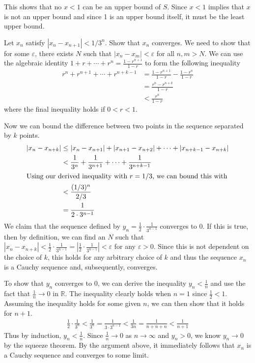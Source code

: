 \documentclass[10pt]{amsart}
\theoremstyle{plain}
\newenvironment{exercise}[1]{%
  \renewcommand\themanualtheoreminner{#1}%
  \manualtheoreminner
}{\endmanualtheoreminner}
\theoremstyle{definition}
\newcommand{\<}{\langle}
\renewcommand{\>}{\rangle}
\begin{document}
This shows that no $x < 1$ can be an upper bound of $S$. Since $x < 1$ implies that $x$ is not an upper bound and since 1 is an upper bound itself, it must be the least upper bound.

\begin{exercise}{1.4.1}
	Let $x_n$ satisfy $|x_n - x_{n+1}| < 1/3^n$. Show that $x_n$ converges.
\end{exercise}
We need to show that for some $\varepsilon$, there exists $N$ such that $|x_n - x_m| < \varepsilon$ for all $n,m > N$. We can use the algebraic identity $1+r+\cdots+r^n = \frac{1-r^{n+1}}{1-r} $ to form the following inequality
\begin{align*}
	r^n + r^{n+1} + \cdots + r^{n+k-1} &= \frac{1-r^{n+1}}{1-r} - \frac{1-r^n}{1-r} \\
					   &= \frac{r^n - r^{n+k}}{1-r} \\
					   &< \frac{r^n}{1-r} 
\end{align*}
where the final inequality holds if $0 < r<1$.

Now we can bound the difference between two points in the sequence separated by $k$ points.
\begin{align*}
	|x_n - x_{n+k}| &\leq |x_n - x_{n+1}| + |x_{n+1} - x_{n+2}| + \cdots + |x_{n+k-1} - x_{n+k}| \\
			&< \frac{1}{3^n} + \frac{1}{3^{n+1}} + \cdots + \frac{1}{3^{n+k-1}} \\
			\intertext{Using our derived inequality with $r=1/3$, we can bound this with}
			&< \frac{(1/3)^n}{2/3} \\
			&= \frac{1}{2 \cdot 3^{n-1}}
\end{align*}
We claim that the sequence defined by $y_n = \frac{1}{2} \cdot \frac{1}{3^{n-1}} $ converges to 0. If this is true, then by definition, we can find an $N$ such that $|x_n - x_{n+k}| < \frac{1}{2} \cdot \frac{1}{3^{n-1}} = | \frac{1}{2} \cdot \frac{1}{3^{n-1}} | < \varepsilon$ for any $\varepsilon>0$. Since this is not dependent on the choice of $k$, this holds for any arbitrary choice of $k$ and thus the sequence $x_n$ is a Cauchy sequence and, subsequently, converges.

To show that $y_n$ converges to 0, we can derive the inequality $y_n < \frac{1}{n} $ and use the fact that $\frac{1}{n} \to 0$ in $\mathbb{R}$. The inequality clearly holds when $ n=1$ since $\frac{1}{2} < 1$. Assuming the inequality holds for some given $n$, we can then show that it holds for  $n+1$.
\begin{align*}
\frac{1}{2}  \cdot \frac{1}{3^{n}} < \frac{1}{3^n} = \frac{1}{3 \cdot 3^{n-1}} < \frac{1}{3n} = \frac{1}{n+n+n} < \frac{1}{n+1}  
\end{align*}
Thus by induction, $y_n < \frac{1}{n}$. Since $\frac{1}{n} \to 0$ as $n\to\infty$ and $y_n > 0$, we know  $y_n\to 0$ by the squeeze theorem. By the argument above, it immediately follows that $x_n$ is a Cauchy sequence and converges to some limit.
\end{document}
